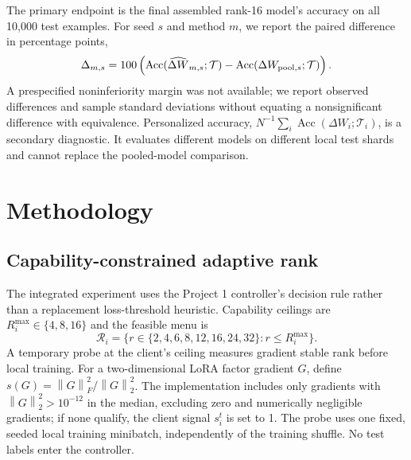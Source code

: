 \documentclass[11pt]{article}
\newcommand{\dW}{\Delta W}
\newcommand{\norm}[1]{\left\lVert#1\right\rVert}
\newcommand{\Acc}{\operatorname{Acc}}
\begin{document}
The primary endpoint is the final assembled rank-16 model's accuracy on all 10,000 test examples. For seed $s$ and method $m$, we report the paired difference in percentage points,
\begin{equation}
 \Delta_{m,s}=100\left(\Acc(\widehat{\dW}_{m,s};\mathcal T)
 -\Acc(\dW_{{\rm pool},s};\mathcal T)\right).
 \label{eq:primary-endpoint}
\end{equation}
A prespecified noninferiority margin was not available; we report observed differences and sample standard deviations without equating a nonsignificant difference with equivalence. Personalized accuracy, $N^{-1}\sum_i\Acc(\dW_i;\mathcal T_i)$, is a secondary diagnostic. It evaluates different models on different local test shards and cannot replace the pooled-model comparison.

\section{Methodology}
\subsection{Capability-constrained adaptive rank}
The integrated experiment uses the Project 1 controller's decision rule rather than a replacement loss-threshold heuristic. Capability ceilings are $R_i^{\max}\in\{4,8,16\}$ and the feasible menu is
\begin{equation}
 \mathcal R_i=\{r\in\{2,4,6,8,12,16,24,32\}:r\le R_i^{\max}\}.
\end{equation}
A temporary probe at the client's ceiling measures gradient stable rank before local training. For a two-dimensional LoRA factor gradient $G$, define $s(G)=\norm{G}_F^2/\norm{G}_2^2$. The implementation includes only gradients with $\norm{G}_2^2>10^{-12}$ in the median, excluding zero and numerically negligible gradients; if none qualify, the client signal $s_i^t$ is set to 1. The probe uses one fixed, seeded local training minibatch, independently of the training shuffle. No test labels enter the controller.
\end{document}
